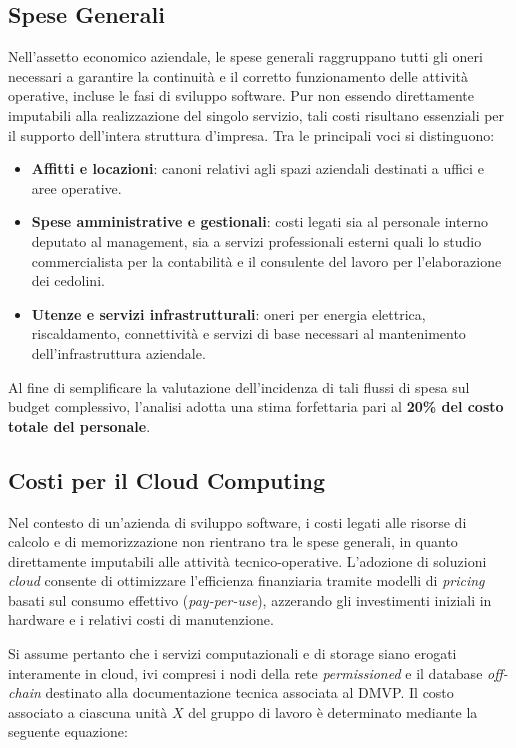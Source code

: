 \subsection{Spese Generali}

Nell'assetto economico aziendale, le spese generali raggruppano tutti gli oneri necessari a garantire la continuit\`a e il corretto funzionamento delle attivit\`a operative, incluse le fasi di sviluppo software. Pur non essendo direttamente imputabili alla realizzazione del singolo servizio, tali costi risultano essenziali per il supporto dell'intera struttura d'impresa. Tra le principali voci si distinguono:

\begin{itemize}
    \item \textbf{Affitti e locazioni}: canoni relativi agli spazi aziendali destinati a uffici e aree operative.
    \item \textbf{Spese amministrative e gestionali}: costi legati sia al personale interno deputato al management, sia a servizi professionali esterni quali lo studio commercialista per la contabilit\`a e il consulente del lavoro per l'elaborazione dei cedolini.
    \item \textbf{Utenze e servizi infrastrutturali}: oneri per energia elettrica, riscaldamento, connettivit\`a e servizi di base necessari al mantenimento dell'infrastruttura aziendale.
\end{itemize}

Al fine di semplificare la valutazione dell'incidenza di tali flussi di spesa sul budget complessivo, l'analisi adotta una stima forfettaria pari al \textbf{20\% del costo totale del personale}.

\subsection{Costi per il Cloud Computing}

Nel contesto di un'azienda di sviluppo software, i costi legati alle risorse di calcolo e di memorizzazione non rientrano tra le spese generali, in quanto direttamente imputabili alle attivit\`a tecnico-operative. L'adozione di soluzioni \textit{cloud} consente di ottimizzare l'efficienza finanziaria tramite modelli di \textit{pricing} basati sul consumo effettivo (\textit{pay-per-use}), azzerando gli investimenti iniziali in hardware e i relativi costi di manutenzione.

Si assume pertanto che i servizi computazionali e di storage siano erogati interamente in cloud, ivi compresi i nodi della rete \textit{permissioned} e il database \textit{off-chain} destinato alla documentazione tecnica associata al DMVP. Il costo associato a ciascuna unit\`a $X$ del gruppo di lavoro \`e determinato mediante la seguente equazione:

